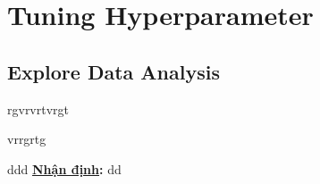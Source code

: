 \chapter{Tuning Hyperparameter}

\section{Explore Data Analysis}

rgvrvrtvrgt \par
vrrgrtg \par

ddd \textbf{\underline{Nhận định}:} dd